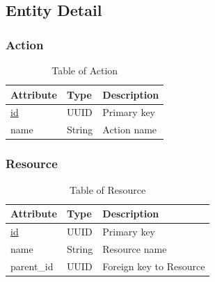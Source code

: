 \subsection{Entity Detail}

\subsubsection{Action}
\begin{table}[H]
    \centering
    \begin{tabular}{|p{3cm}|p{2cm}|p{\dimexpr\textwidth-6.8cm}|} %
        \hline
        \rowcolor[HTML]{C0C0C0} 
        \textbf{Attribute} & \textbf{Type} & \textbf{Description} \\ \hline
        \underline{id} & UUID & Primary key \\ \hline
        name & String & Action name \\ \hline
    \end{tabular}
    \caption{Table of Action}
    \label{tab:action-table}
\end{table}

\subsubsection{Resource}
\begin{table}[H]
    \centering
    \begin{tabular}{|p{3cm}|p{2cm}|p{\dimexpr\textwidth-6.8cm}|} %
        \hline
        \rowcolor[HTML]{C0C0C0} 
        \textbf{Attribute} & \textbf{Type} & \textbf{Description} \\ \hline
        \underline{id} & UUID & Primary key \\ \hline
        name & String & Resource name \\ \hline
        parent\_id & UUID & Foreign key to Resource \\ \hline
    \end{tabular}
    \caption{Table of Resource}
    \label{tab:resource-table}
\end{table}

